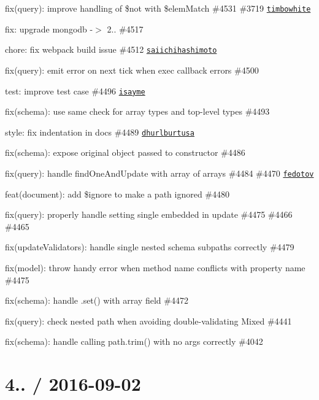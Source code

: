 \begin{DoxyItemize}
\item fix(query)\+: improve handling of \$not with \$elem\+Match \#4531 \#3719 \href{https://github.com/timbowhite}{\tt timbowhite}
\item fix\+: upgrade mongodb -\/$>$ 2.. \#4517
\item chore\+: fix webpack build issue \#4512 \href{https://github.com/saiichihashimoto}{\tt saiichihashimoto}
\item fix(query)\+: emit error on next tick when exec callback errors \#4500
\item test\+: improve test case \#4496 \href{https://github.com/isayme}{\tt isayme}
\item fix(schema)\+: use same check for array types and top-\/level types \#4493
\item style\+: fix indentation in docs \#4489 \href{https://github.com/dhurlburtusa}{\tt dhurlburtusa}
\item fix(schema)\+: expose original object passed to constructor \#4486
\item fix(query)\+: handle find\+One\+And\+Update with array of arrays \#4484 \#4470 \href{https://github.com/fedotov}{\tt fedotov}
\item feat(document)\+: add \$ignore to make a path ignored \#4480
\item fix(query)\+: properly handle setting single embedded in update \#4475 \#4466 \#4465
\item fix(update\+Validators)\+: handle single nested schema subpaths correctly \#4479
\item fix(model)\+: throw handy error when method name conflicts with property name \#4475
\item fix(schema)\+: handle .set() with array field \#4472
\item fix(query)\+: check nested path when avoiding double-\/validating Mixed \#4441
\item fix(schema)\+: handle calling path.\+trim() with no args correctly \#4042
\end{DoxyItemize}

\section*{4.. / 2016-\/09-\/02 }


